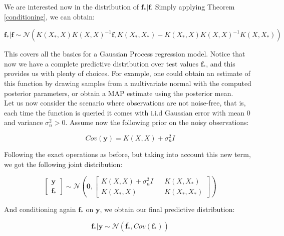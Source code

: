 \documentclass[10pt,a4paper,twoside]{book}
\begin{document}
We are interested now in the distribution of $\boldsymbol{f_{*}}|\boldsymbol{f}$. Simply applying Theorem \ref{conditioning}, we can obtain:

\begin{equation}
\boldsymbol{f_*|f} \sim \mathcal{N}\left(K(X_*, X)K(X, X)^{-1}\boldsymbol{f}, K(X_*, X_*) - K(X_*, X)K(X, X)^{-1}K(X, X_*) \right)
\end{equation}

This covers all the basics for a Gaussian Process regression model. Notice that now we have a complete predictive distribution over test values $\boldsymbol{f_{*}}$, and this provides us with plenty of choices. For example, one could obtain an estimate of this function by drawing samples from a multivariate normal with the computed posterior parameters, or obtain a MAP estimate using the posterior mean.\\

Let us now consider the scenario where observations are not noise-free, that is, each time the function is queried it comes with i.i.d Gaussian error with mean $0$ and variance $\sigma_n^2 > 0$. Assume now the following prior on the noisy observations:

\begin{equation}
Cov(\boldsymbol{y}) = K(X, X) + \sigma^2_n I 
\end{equation}

Following the exact operations as before, but taking into account this new term, we got the following joint distribution:

\begin{equation}
\begin{bmatrix}
\boldsymbol{y}\\
\boldsymbol{f_*}
\end{bmatrix} \sim \mathcal{N}\left(
\boldsymbol{0},
\begin{bmatrix}
K(X, X) + \sigma^2_n I && K(X, X_*) \\
K(X_*, X) && K(X_*, X_*)
\end{bmatrix}
\right)
\end{equation}

And conditioning again $\boldsymbol{f_{*}}$ on $\boldsymbol{y}$, we obtain our final predictive distribution:

\begin{equation}
\boldsymbol{f_*|y} \sim \mathcal{N}(\boldsymbol{\overline{f_*}},  Cov(\boldsymbol{f_*}))
\end{equation}
\end{document}

